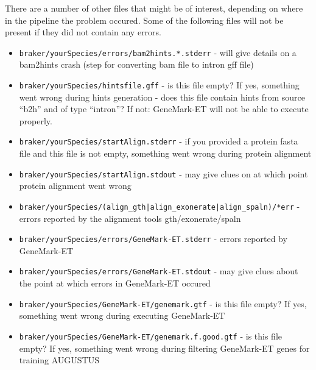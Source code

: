 \documentclass[a4paper,10pt]{report}
\begin{document}
There are a number of other files that might be of interest, depending on where in the pipeline the
problem occured. Some of the following files will not be present if they did not contain any errors.

\begin{itemize}
 \item  \texttt{braker/yourSpecies/errors/bam2hints.*.stderr} - will give details on a bam2hints crash (step for 
                                                  converting bam file to intron gff file)
 
 \item  \texttt{braker/yourSpecies/hintsfile.gff} - is this file empty? If yes, something went wrong during hints 
                                      generation
                                    - does this file contain hints from source ``b2h'' and of type 
                                      ``intron''? If not: GeneMark-ET will not be able to execute 
                                      properly.
 
 \item  \texttt{braker/yourSpecies/startAlign.stderr} - if you provided a protein fasta file and this file is not
                                          empty, something went wrong during protein alignment
\item    \texttt{braker/yourSpecies/startAlign.stdout} - may give clues on at which point protein alignment went
                                          wrong

 \item  \texttt{braker/yourSpecies/(align\_gth|align\_exonerate|align\_spaln)/*err} - errors reported by the 
																																		 alignment tools 
                                                                     gth/exonerate/spaln

 \item  \texttt{braker/yourSpecies/errors/GeneMark-ET.stderr} - errors reported by GeneMark-ET
 \item  \texttt{braker/yourSpecies/errors/GeneMark-ET.stdout} - may give clues about the point at which errors in
                                                  GeneMark-ET occured

 \item  \texttt{braker/yourSpecies/GeneMark-ET/genemark.gtf} - is this file empty? If yes, something went wrong 
                                                 during executing GeneMark-ET

 \item  \texttt{braker/yourSpecies/GeneMark-ET/genemark.f.good.gtf} - is this file empty? If yes, something went
                                                        wrong during filtering GeneMark-ET genes 
                                                        for training AUGUSTUS
 

\end{itemize}
\end{document}

